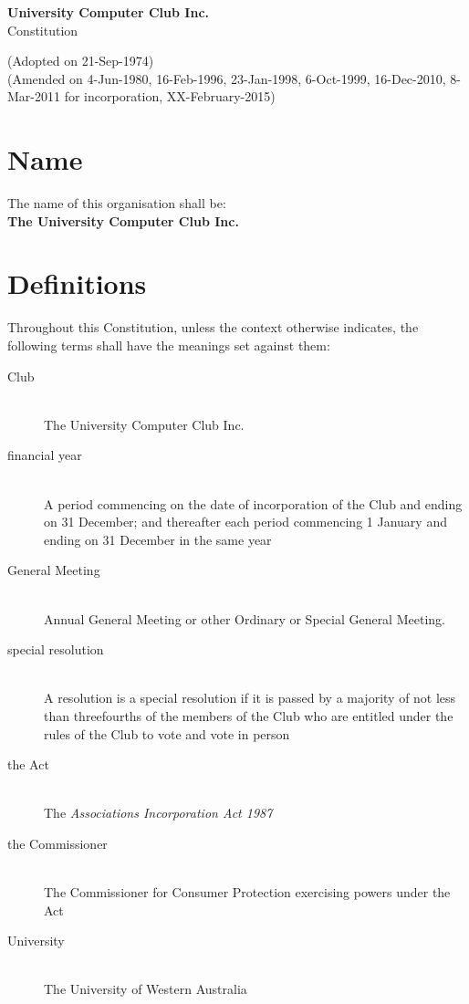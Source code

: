 \documentclass[11pt]{article} %
\makeatletter
\renewcommand\tableofcontents{%
    \@starttoc{toc}%
}
\makeatother
\begin{document}
\noindent
\begin{center}
\textbf{\LARGE{University Computer Club Inc.}}\\
\Large{Constitution}
\end{center}

\noindent
\small{(Adopted on 21-Sep-1974)\\
(Amended on 4-Jun-1980, 16-Feb-1996, 23-Jan-1998, 6-Oct-1999, 16-Dec-2010, 8-Mar-2011 for incorporation, XX-February-2015)\\}

\begingroup
	\let\cleardoublepage\clearpage
	\def\addvspace#1{}
	\tableofcontents
\endgroup


\section{Name}
\begin{description}
	\item The name of this organisation shall be: \hfill \\
		\large{\textbf{The University Computer Club Inc.}}
\end{description}

\section{Definitions}
Throughout this Constitution, unless the context otherwise indicates, the following terms shall have the meanings set against them:
\begin{description}
	\item[Club] \hfill \\
		The University Computer Club Inc.
	\item[financial year] \hfill \\
		A period commencing on the date of incorporation of the Club and ending on 31 December; and thereafter each period commencing 1 January and ending on 31 December in the same year
	\item[General Meeting] \hfill \\
		Annual General Meeting or other Ordinary or Special General Meeting.
	\item[special resolution] \hfill \\
		A resolution is a special resolution if it is passed by a majority of not less than threefourths of the members of the Club who are entitled under the rules of the Club to vote and vote in person
	\item[the Act] \hfill \\
		The \emph{Associations Incorporation Act 1987}
	\item[the Commissioner] \hfill \\
		The Commissioner for Consumer Protection exercising powers under the Act
	\item[University] \hfill \\
		The University of Western Australia
\end{description}
\end{document}
